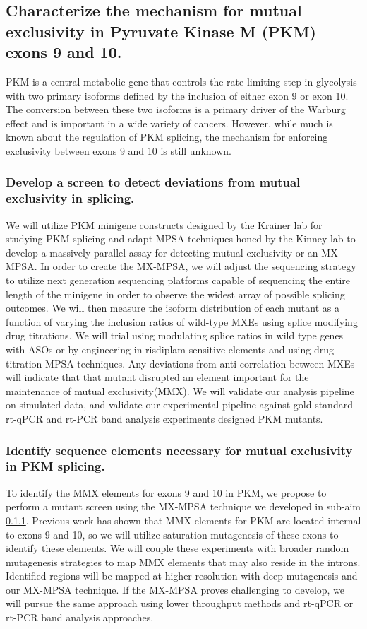 \documentclass{article}
\begin{document}
\subsection{Characterize the mechanism for mutual exclusivity in Pyruvate Kinase M (PKM) exons 9 and 10.}
PKM is a central metabolic gene that controls the rate limiting step in glycolysis with two primary isoforms defined by the inclusion of either exon 9 or exon 10. 
The conversion between these two isoforms is a primary driver of the Warburg effect and is important in a wide variety of cancers.\Cite{Christofk2008-bu,Ma2022-dt} 
However, while much is known about the regulation of PKM splicing, the mechanism for enforcing exclusivity between exons 9 and 10 is still unknown.
%
\subsubsection{Develop a screen to detect deviations from mutual exclusivity in splicing.} \label{aim:screen_dev}
We will utilize PKM minigene constructs designed by the Krainer lab for studying PKM splicing \cite{Wang2012-dr} and adapt MPSA techniques honed by the Kinney lab \cite{Wong2018-vq,Ishigami2022-bf} to develop a massively parallel assay for detecting mutual exclusivity or an MX-MPSA.
In order to create the MX-MPSA, we will adjust the sequencing strategy to utilize next generation sequencing platforms capable of sequencing the entire length of the minigene in order to observe the widest array of possible splicing outcomes.
We will then measure the isoform distribution of each mutant as a function of varying the inclusion ratios of wild-type MXEs using splice modifying drug titrations.
We will trial using modulating splice ratios in wild type genes with ASOs\cite{Wang2012-ea,Ma2022-dt} or by engineering in risdiplam sensitive elements and using drug titration MPSA techniques\cite{Ishigami2022-bf}. 
Any deviations from anti-correlation between MXEs will indicate that that mutant disrupted an element important for the maintenance of mutual exclusivity(MMX). We will validate our analysis pipeline on simulated data, and validate our experimental pipeline against gold standard rt-qPCR and rt-PCR band analysis experiments designed PKM mutants.
% 
\subsubsection{Identify sequence elements necessary for mutual exclusivity in PKM splicing.} \label{aim:PKM_motif_finding}
To identify the MMX elements for exons 9 and 10 in PKM, we propose to perform a mutant screen using the MX-MPSA technique we developed in sub-aim \ref{aim:screen_dev}. 
Previous work has shown that MMX elements for PKM are located internal to exons 9 and 10,\cite{Wang2012-dr} so we will utilize saturation mutagenesis of these exons to identify these elements.
We will couple these experiments with broader random mutagenesis strategies to map MMX elements that may also reside in the introns. 
Identified regions will be mapped at higher resolution with deep mutagenesis and our MX-MPSA technique. If the MX-MPSA proves challenging to develop, we will pursue the same approach using lower throughput methods and rt-qPCR or rt-PCR band analysis approaches.
%
\end{document}
